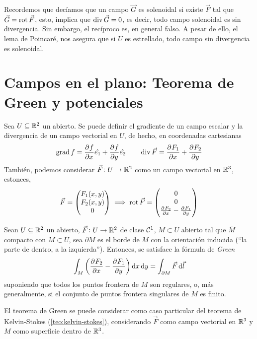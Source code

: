 Recordemos que decíamos que un campo $\vec{G}$ es solenoidal si existe $\vec{F}$ tal que $\vec{G} = \operatorname{rot} \vec{F}$, esto, implica
que $\operatorname{div} \vec{G} = 0$, es decir, todo campo solenoidal es sin divergencia. Sin embargo, el recíproco es, en general falso. A pesar de
ello, el lema de Poincar\'e, nos asegura que si $U$ es estrellado, todo campo sin divergencia es solenoidal.

\section{Campos en el plano: Teorema de Green y potenciales}

\begin{defi}
    Sea $U \subseteq \mathbb{R}^2$ un abierto. Se puede definir el gradiente de un campo escalar y la divergencia de un campo
    vectorial en $U$, de hecho, en coordenadas cartesianas
    \[
        \operatorname{grad} f = \frac{\partial^{} f}{\partial x^{}} \hat{e_1} + \frac{\partial^{} f}{\partial y^{}} \hat{e_2} \qquad
        \operatorname{div} \vec{F} = \frac{\partial^{} F_1}{\partial x^{}} + \frac{\partial^{} F_2}{\partial y^{}}
    \]
    Tambi\'en, podemos considerar $\vec{F} \colon U \to \mathbb{R}^2$ como un campo vectorial en $\mathbb{R}^3$, estonces,
    \[
        \vec{F} = 
        \begin{pmatrix}
            F_1(x,y) \\ F_2(x,y) \\ 0
        \end{pmatrix} \implies
        \operatorname{rot} \vec{F} =
        \begin{pmatrix}
            0 \\ 0 \\ \frac{\partial^{} F_2}{\partial x^{}} - \frac{\partial^{} F_1}{\partial y^{}}
        \end{pmatrix}
    \]
\end{defi}

\begin{teo}[de Green]
    Sean $U \subseteq \mathbb{R}^2$ un abierto, $\vec{F} \colon U \to \mathbb{R}^2$ de clase $\mathcal{C}^1$, $M \subset U$ abierto tal que
    $\bar{M}$ compacto con $\bar{M} \subset U$, sea $\partial M$ es el borde de $M$ con la orientación inducida (``la parte de dentro,
    a la izquierda''). Entonces, se satisface la fórmula de \emph{Green}
    \[
        \int_M \left( \pdv{F_2}{x} - \pdv{F_1}{y} \right) \dif x \dif y = \int_{\partial M} \vec{F} \dif \vec{l}
    \]
    suponiendo que todos los puntos frontera de $M$ son regulares, o, más generalmente, si el conjunto de puntos frontera singulares
    de $M$ es finito.
\end{teo}

\begin{obs}
    El teorema de Green se puede considerar como caso particular del teorema de Kelvin-Stokes (\ref{teo:kelvin-stokes}), considerando $\vec{F}$
    como campo vectorial en $\mathbb{R}^3$ y $M$ como superficie dentro de $\mathbb{R}^3$.
\end{obs}

